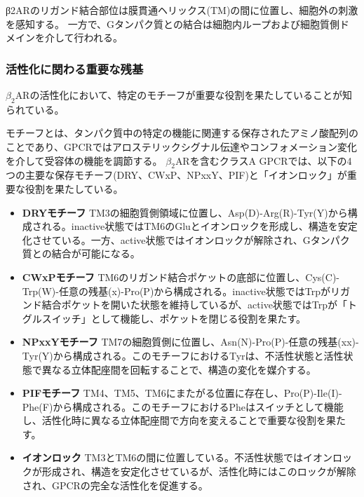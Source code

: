 β2ARのリガンド結合部位は膜貫通ヘリックス(TM)の間に位置し、細胞外の刺激を感知する。
一方で、Gタンパク質との結合は細胞内ループおよび細胞質側ドメインを介して行われる。


\subsubsection{活性化に関わる重要な残基}
$\beta_2$ARの活性化において、特定のモチーフ\cite{nygaard2009ligand}\cite{lee2013mapping}が重要な役割を果たしていることが知られている。

モチーフとは、タンパク質中の特定の機能に関連する保存されたアミノ酸配列のことであり、GPCRではアロステリックシグナル伝達やコンフォメーション変化を介して受容体の機能を調節する。
$\beta_2$ARを含むクラスA GPCRでは、以下の4つの主要な保存モチーフ(DRY、CWxP、NPxxY、PIF)と「イオンロック」が重要な役割を果たしている。

\begin{itemize}
  \item \textbf{DRYモチーフ}  
  TM3の細胞質側領域に位置し、Asp(D)-Arg(R)-Tyr(Y)から構成される。inactive状態ではTM6のGluとイオンロックを形成し、構造を安定化させている。一方、active状態ではイオンロックが解除され、Gタンパク質との結合が可能になる。

  \item \textbf{CWxPモチーフ}  
  TM6のリガンド結合ポケットの底部に位置し、Cys(C)-Trp(W)-任意の残基(x)-Pro(P)から構成される。inactive状態ではTrpがリガンド結合ポケットを開いた状態を維持しているが、active状態ではTrpが「トグルスイッチ」として機能し、ポケットを閉じる役割を果たす。

  \item \textbf{NPxxYモチーフ}  
  TM7の細胞質側に位置し、Asn(N)-Pro(P)-任意の残基(xx)-Tyr(Y)から構成される。このモチーフにおけるTyrは、不活性状態と活性状態で異なる立体配座間を回転することで、構造の変化を媒介する。

  \item \textbf{PIFモチーフ}  
  TM4、TM5、TM6にまたがる位置に存在し、Pro(P)-Ile(I)-Phe(F)から構成される。このモチーフにおけるPheはスイッチとして機能し、活性化時に異なる立体配座間で方向を変えることで重要な役割を果たす。

  \item \textbf{イオンロック}  
  TM3とTM6の間に位置している。不活性状態ではイオンロックが形成され、構造を安定化させているが、活性化時にはこのロックが解除され、GPCRの完全な活性化を促進する。
\end{itemize}


